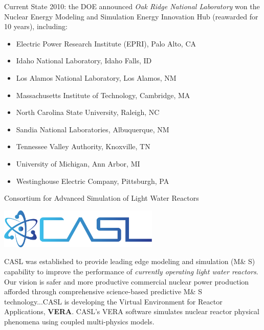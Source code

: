 \documentclass[xcolor=x11names,compress, handout]{beamer}
\renewcommand{\(}{\begin{columns}}
\renewcommand{\)}{\end{columns}}
\newcommand{\<}[1]{\begin{column}{#1}}
\renewcommand{\>}{\end{column}}
\begin{document}
\begin{frame}{Current State}
2010: the DOE announced \emph{Oak Ridge National Laboratory} won the Nuclear Energy Modeling and Simulation Energy Innovation Hub (reawarded for 10 years), including:	
\begin{itemize}
\item Electric Power Research Institute (EPRI), Palo Alto, CA
\item Idaho National Laboratory, Idaho Falls, ID
\item Los Alamos National Laboratory, Los Alamos, NM
\item Massachusetts Institute of Technology, Cambridge, MA
\item North Carolina State University, Raleigh, NC
\item Sandia National Laboratories, Albuquerque, NM
\item Tennessee Valley Authority, Knoxville, TN
\item University of Michigan, Ann Arbor, MI
\item Westinghouse Electric Company, Pittsburgh, PA
\end{itemize}
\end{frame}

\begin{frame}{Consortium for Advanced Simulation of Light Water Reactors}
\begin{center}
\includegraphics[height=0.75in,clip]{CASL}
\end{center}
CASL was established to provide leading edge modeling and simulation (M\& S) capability to improve the performance of \textit{currently operating light water reactors}. Our vision is safer and more productive commercial nuclear power production afforded through comprehensive science-based predictive M\& S technology...CASL is developing the Virtual Environment for Reactor Applications, \textbf{VERA}. CASL's VERA software simulates nuclear reactor physical phenomena using coupled multi-physics models. 
\end{frame}
\end{document}
